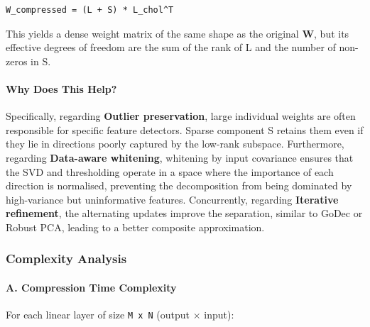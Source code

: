 \vspace{0.5em}
\begin{mdframed}[backgroundcolor=codebg, linecolor=codeframe, linewidth=1pt, roundcorner=4pt, innerleftmargin=2pt, innerrightmargin=5pt, innertopmargin=5pt, innerbottommargin=5pt]
\begin{lstlisting}
W_compressed = (L + S) * L_chol^T
\end{lstlisting}
\end{mdframed}
\vspace{0.5em}

This yields a dense weight matrix of the same shape as the original \textbf{W}, but its effective degrees of freedom are the sum of the rank of L and the number of non-zeros in S.

\paragraph{Why Does This Help?}

Specifically, regarding \textbf{Outlier preservation}, large individual weights are often responsible for specific feature detectors. Sparse component S retains them even if they lie in directions poorly captured by the low-rank subspace. Furthermore, regarding \textbf{Data-aware whitening}, whitening by input covariance ensures that the SVD and thresholding operate in a space where the importance of each direction is normalised, preventing the decomposition from being dominated by high-variance but uninformative features. Concurrently, regarding \textbf{Iterative refinement}, the alternating updates improve the separation, similar to GoDec or Robust PCA, leading to a better composite approximation.



\subsubsection*{Complexity Analysis}

\paragraph{A. Compression Time Complexity}

For each linear layer of size \texttt{M x N} (output $\times$ input):

